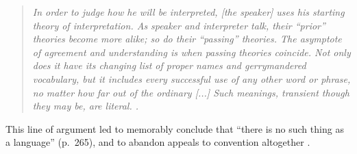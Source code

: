 \begin{quote}
\emph{In order to judge how he will be interpreted, [the speaker] uses his starting theory of interpretation. %
As speaker and interpreter talk, their ``prior'' theories become more alike; so do their ``passing'' theories. 
The asymptote of agreement and understanding is when passing theories coincide. 
Not only does it have its changing list of proper names and gerrymandered vocabulary, but it includes every successful use of any other word or phrase, no matter how far out of the ordinary [...] 
Such meanings, transient though they may be, are literal. \cite[p.~261]{davidson_nice_1986}.}
\end{quote}

This line of argument led  to memorably conclude that ``there is no such thing as a language'' (p.~265), and to abandon appeals to convention altogether \cite<see also>[for discussion]{heck_idiolect,lepore2007reality,hacking1986nice,dummett1994}.%

